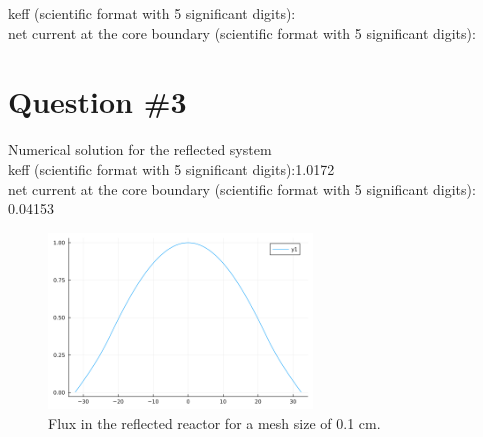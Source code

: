 \documentclass[11pt,a4paper]{article}
\begin{document}
keff (scientific format with 5 significant digits): \\
net current at the core boundary (scientific format with 5 significant digits): \\

\section{Question \#3}
Numerical solution for the reflected system \\
keff (scientific format with 5 significant digits):1.0172\\
net current at the core boundary (scientific format with 5 significant digits): 0.04153\\
\begin{figure}[h]
	\includegraphics[width=7cm]{../../figs/ex2/reflector.png}
	\centering
	\caption{Flux in the reflected reactor for a mesh size of 0.1 cm.}
\end{figure}

\end{document}
